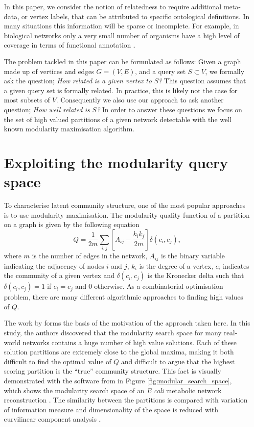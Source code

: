 \documentclass[sigconf]{acmart}
\begin{document}
In this paper, we consider the notion of relatedness to require additional meta-data, or vertex labels, that can be attributed to specific ontological definitions.
In many situations this information will be sparse or incomplete.
For example, in biological networks only a very small number of organisms have a high level of coverage in terms of functional annotation \cite{bassel2012systems}.

The problem tackled in this paper can be formulated as follows:
Given a graph made up of vertices and edges $G = (V, E)$, and a query set $S \subset V$, we formally ask the question; \textit{How related is a given vertex to $S$?}
This question assumes that a given query set is formally related.
In practice, this is likely not the case for most subsets of $V$.
Consequently we also use our approach to ask another question; \textit{How well related is $S$?}
In order to answer these questions we focus on the set of high valued partitions of a given network detectable with the well known modularity maximisation algorithm.

\section{Exploiting the modularity query space}
To characterise latent community structure, one of the most popular approaches is to use modularity maximisation.
The modularity quality function of a partition on a graph is given by the following equation \cite{newman2004}
\begin{equation}\label{eq:modularity}
  Q = \frac{1}{2m}\sum_{i,j} \left[A_{ij} - \frac{k_i k_j}{2m}\right]\delta(c_i, c_j),
\end{equation}
where $m$ is the number of edges in the network, $A_{ij}$ is the binary variable indicating the adjacency of nodes $i$ and $j$, $k_i$ is the degree of a vertex, $c_i$ indicates the community of a given vertex and $\delta(c_i, c_j)$ is the Kronecker delta such that $\delta(c_i, c_j) = 1$ if $c_i = c_j$ and $0$ otherwise.
As a combinatorial optimisation problem, there are many different algorithmic approaches to finding high values of $Q$.

The work by \cite{good2010performance} forms the basis of the motivation of the approach taken here.
In this study, the authors discovered that the modularity search space for many real-world networks contains a huge number of high value solutions.
Each of these solution partitions are extremely close to the global maxima, making it both difficult to find the optimal value of $Q$ and difficult to argue that the highest scoring partition is the ``true'' community structure.
This fact is visually demonstrated with the software from \cite{good2010performance} in Figure \ref{fig:modular_search_space}, which shows the modularity search space of an \textit{E coli} metabolic network reconstruction \cite{GuimeraNature2005}.
The similarity between the partitions is compared with variation of information measure \cite{meilua2003comparing} and dimensionality of the space is reduced with curvilinear component analysis \cite{demartines1997curvilinear}.
\end{document}
